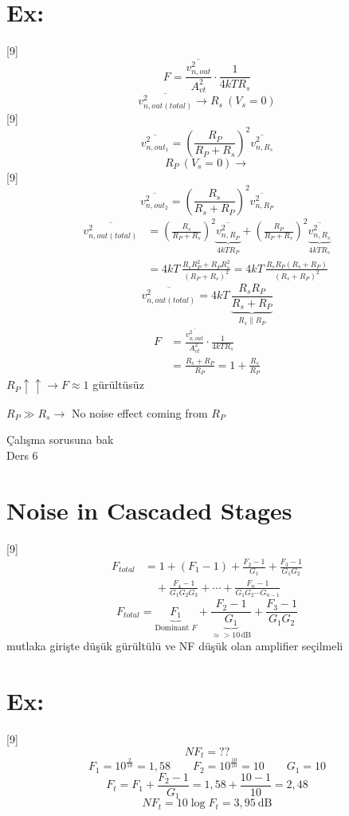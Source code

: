 \documentclass[11pt,a4paper]{article}
\begin{document}
\section{Ex:}
[9]
\[ F = \frac{\overline{v_{n,out}^2}}{A_{vt}^2}\cdot\frac{1}{4kTR_s} \]
\[ \overline{v_{n,out(total)}^2} \to R_s\ (V_s=0) \]
[9]
\[ \overline{v_{n,out_1}^2} = \left(\frac{R_P}{R_P+R_s}\right)^2\overline{v_{n,R_s}^2} \]
\[ R_P\ (V_s=0) \to \]
[9]
\[ \overline{v_{n,out_2}^2} = \left(\frac{R_s}{R_s+R_P}\right)^2\overline{v_{n,R_P}^2} \]
\begin{align*}
\overline{v_{n,out(total)}^2} &= \left(\frac{R_s}{R_P+R_s}\right)^2\underbrace{\overline{v_{n,R_P}^2}}_{4kTR_P} + \left(\frac{R_P}{R_P+R_s}\right)^2\underbrace{\overline{v_{n,R_s}^2}}_{4kTR_s}\\
&= 4kT\,\frac{R_sR_P^2+R_PR_s^2}{(R_P+R_s)^2} = 4kT\,\frac{R_sR_P(R_s+R_P)}{(R_s+R_P)^2}
\end{align*}
\[ \overline{v_{n,out(total)}^2} = 4kT\,\underbrace{\frac{R_sR_P}{R_s+R_P}}_{R_s\parallel R_P} \]
\begin{align*}
F &= \frac{\overline{v_{n,out}^2}}{A_{vt}^2}\cdot\frac{1}{4kTR_s}\\
&= \frac{R_s+R_P}{R_P} = 1+\frac{R_s}{R_P}
\end{align*}
$R_P\uparrow\!\uparrow \to F\approx 1$ gürültüsüz

$R_P \gg R_s \to$ No noise effect coming from $R_P$

Çalışma sorusuna bak\\ Ders 6

\section{Noise in Cascaded Stages}
[9]
\begin{align*}
F_{total} &= 1 + (F_1-1) + \frac{F_2-1}{G_1} + \frac{F_3-1}{G_1G_2}\\
&\quad + \frac{F_4-1}{G_1G_2G_3} + \cdots + \frac{F_n-1}{G_1G_2\cdots G_{n-1}}
\end{align*}
\[ F_{total} = \underbrace{F_1}_{\text{Dominant } F} + \frac{F_2-1}{\underbrace{G_1}_{\approx{>}10\,\mathrm{dB}}} + \frac{F_3-1}{G_1G_2} \]
mutlaka girişte düşük gürültülü ve NF düşük olan amplifier seçilmeli

\section{Ex:}
[9]
\[ NF_t = ?? \]
\[ F_1 = 10^{\frac{2}{10}} = 1{,}58 \qquad F_2 = 10^{\frac{10}{10}} = 10 \qquad G_1 = 10 \]
\[ F_t = F_1 + \frac{F_2-1}{G_1} = 1{,}58 + \frac{10-1}{10} = 2{,}48 \]
\[ NF_t = 10\log F_t = 3{,}95\ \mathrm{dB} \]
\end{document}
